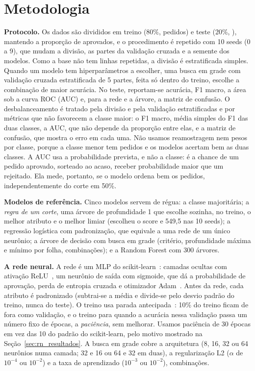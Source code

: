 \section{Metodologia}\label{sec:rn_metodo}

\textbf{Protocolo.} Os dados são divididos em treino (80\%, \rnTreino{} pedidos) e teste (20\%, \rnTeste), mantendo a proporção de aprovados, e o procedimento é repetido com 10 seeds (0 a 9), que mudam a divisão, as partes da validação cruzada e a semente dos modelos. Como a base não tem linhas repetidas, a divisão é estratificada simples. Quando um modelo tem hiperparâmetros a escolher, uma busca em grade com validação cruzada estratificada de 5 partes, feita só dentro do treino, escolhe a combinação de maior acurácia. No teste, reportam-se acurácia, F1 macro, a área sob a curva ROC (AUC) e, para a rede e a árvore, a matriz de confusão. O desbalanceamento é tratado pela divisão e pela validação estratificadas e por métricas que não favorecem a classe maior: o F1 macro, média simples do F1 das duas classes, a AUC, que não depende da proporção entre elas, e a matriz de confusão, que mostra o erro em cada uma. Não usamos reamostragem nem pesos por classe, porque a classe menor tem \rnRejeitadosBase{} pedidos e os modelos acertam bem as duas classes. A AUC usa a probabilidade prevista, e não a classe: é a chance de um pedido aprovado, sorteado ao acaso, receber probabilidade maior que um rejeitado. Ela mede, portanto, se o modelo ordena bem os pedidos, independentemente do corte em 50\%.

\textbf{Modelos de referência.} Cinco modelos servem de régua: a classe majoritária; a \emph{regra de um corte}, uma árvore de profundidade 1 que escolhe sozinha, no treino, o melhor atributo e o melhor limiar (escolheu o score e 549,5 nas 10 seeds); a regressão logística com padronização, que equivale a uma rede de um único neurônio; a árvore de decisão com busca em grade (critério, profundidade máxima e mínimo por folha, \rnCombinacoesArv{} combinações); e a Random Forest com 300 árvores.

\textbf{A rede neural.} A rede é um MLP do scikit-learn~\cite{pedregosa:11}: camadas ocultas com ativação ReLU~\cite{nair:10}, um neurônio de saída com sigmoide, que dá a probabilidade de aprovação, perda de entropia cruzada e otimizador Adam~\cite{kingma:15}. Antes da rede, cada atributo é padronizado (subtrai-se a média e divide-se pelo desvio padrão do treino, nunca do teste). O treino usa parada antecipada~\cite{prechelt:98}: 10\% do treino ficam de fora como validação, e o treino para quando a acurácia nessa validação passa um número fixo de épocas, a \emph{paciência}, sem melhorar. Usamos paciência de 30 épocas em vez das 10 do padrão do scikit-learn, pelo motivo mostrado na Seção~\ref{sec:rn_resultados}. A busca em grade cobre a arquitetura (8, 16, 32 ou 64 neurônios numa camada; 32 e 16 ou 64 e 32 em duas), a regularização L2 ($\alpha$ de $10^{-4}$ ou $10^{-2}$) e a taxa de aprendizado ($10^{-3}$ ou $10^{-2}$), \rnCombinacoes{} combinações.

